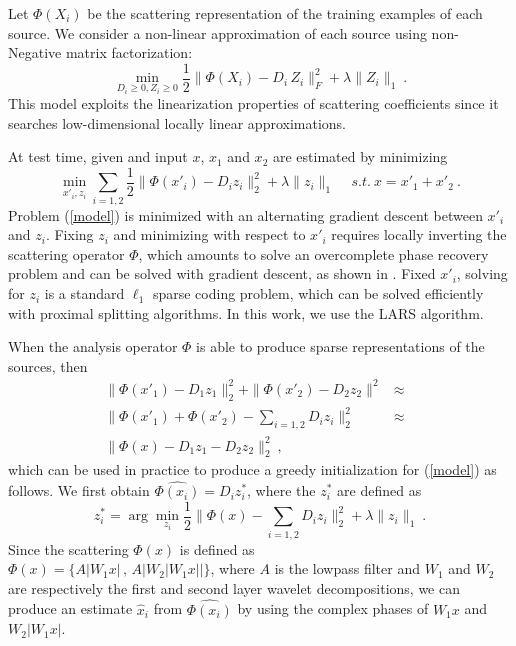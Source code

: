 Let $\Phi(X_i)$ be the scattering representation of the training examples of each 
source. We consider a non-linear approximation of each source using non-Negative
matrix factorization:
\begin{equation}
\min_{D_i\geq 0, Z_i\geq 0} \frac{1}{2} \| \Phi(X_i) - D_i \, Z_i \|_F^2 + \lambda \| Z_i \|_1~.
\end{equation}
This model exploits the linearization properties of scattering coefficients since it 
searches low-dimensional locally linear approximations. 

At test time, given and input $x$, $x_1$ and $x_2$ are estimated by minimizing
\begin{equation}
\label{model}
\min_{x'_i, z_i} \sum_{i=1,2} \frac{1}{2} \| \Phi(x'_i) - D_i z_i \|_2^2 + \lambda \| z_i \|_1 \quad\,s.t. ~x=x'_1 + x'_2~.
\end{equation}
Problem (\ref{model}) is minimized with an alternating gradient descent between $x'_i$ and $z_i$. 
Fixing $z_i$ and minimizing with respect to $x'_i$ requires locally inverting the scattering 
operator $\Phi$, which amounts to solve an overcomplete phase recovery problem and 
can be solved with gradient descent, as shown in \cite{bruna2013audio}. 
Fixed $x'_i$, solving for $z_i$ is a standard $\ell_1$ sparse coding problem, which can be solved 
efficiently with proximal splitting algorithms. In this work, we use the LARS algorithm. 
 
When the analysis operator $\Phi$ is able to produce sparse representations of the sources, 
then 
{\small
\begin{eqnarray*}
\| \Phi(x'_1) - D_1 z_1 \|_2^2 + \| \Phi(x'_2) - D_2 z_2 \|^2 &\approx& \\
\| \Phi(x'_1) + \Phi(x'_2) - \sum_{i=1,2} D_i z_i \|_2^2 &\approx& \\
 \| \Phi(x) - D_1 z_1 - D_2 z_2 \|_2^2 ~,
\end{eqnarray*}}
which can be used in practice to produce a greedy initialization for (\ref{model}) as follows. 
We first obtain $\widehat{\Phi(x_i)}= D_i z^*_i$, where the $z^*_i$ are defined as 
$$z^*_i = \arg\min_{z_i} \frac{1}{2}\| \Phi(x) - \sum_{i=1,2} D_i z_i \|_2^2 +\lambda \| z_i \|_1~.$$
Since the scattering $\Phi(x)$ is defined as \\$\Phi(x)= \{ A |W_1 x | \,,\, A | W_2 | W_1 x | | \}$, 
where $A$ is the lowpass filter and $W_1$ and $W_2$ are respectively the first and 
second layer wavelet decompositions, we can produce an estimate $\widehat{x}_i$ from 
$\widehat{\Phi(x_i)}$ by using the complex phases of $W_1 x$ and $W_2 |W_1 x|$.



